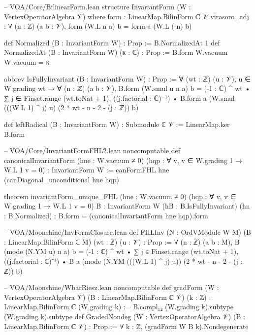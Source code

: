 \begin{leancode}
-- VOA/Core/BilinearForm.lean
structure InvariantForm (W : VertexOperatorAlgebra 𝒱) where
  form : LinearMap.BilinForm ℂ 𝒱
  virasoro_adj : ∀ (n : ℤ) (a b : 𝒱), form (W.L n a) b = form a (W.L (-n) b)

def Normalized (B : InvariantForm W) : Prop := B.NormalizedAt 1
def NormalizedAt (B : InvariantForm W) (κ : ℂ) : Prop :=
  B.form W.vacuum W.vacuum = κ

abbrev IsFullyInvariant (B : InvariantForm W) : Prop :=
  ∀ (wt : ℤ) (u : 𝒱), u ∈ W.grading wt → ∀ (n : ℤ) (a b : 𝒱),
    B.form (W.smul u n a) b
      = (-1 : ℂ) ^ wt • ∑ j ∈ Finset.range (wt.toNat + 1), ((j.factorial : ℂ)⁻¹) •
          B.form a (W.smul (((W.L 1) ^ j) u) (2 * wt - n - 2 - (j : ℤ)) b)

def leftRadical (B : InvariantForm W) : Submodule ℂ 𝒱 := LinearMap.ker B.form

-- VOA/Core/InvariantFormFHL2.lean
noncomputable def canonicalInvariantForm (hne : W.vacuum ≠ 0)
    (hqp : ∀ v, v ∈ W.grading 1 → W.L 1 v = 0) : InvariantForm W :=
  canFormFHL hne (canDiagonal_unconditional hne hqp)

theorem invariantForm_unique_FHL (hne : W.vacuum ≠ 0)
    (hqp : ∀ v, v ∈ W.grading 1 → W.L 1 v = 0) {B : InvariantForm W}
    (hB : B.IsFullyInvariant) (hn : B.Normalized) :
    B.form = (canonicalInvariantForm hne hqp).form

-- VOA/Moonshine/InvFormClosure.lean
def FHLInv (N : OrdVModule W M) (B : LinearMap.BilinForm ℂ M) (wt : ℤ) (u : 𝒱) : Prop :=
  ∀ (n : ℤ) (a b : M), B (mode (N.YM u) n a) b
    = (-1 : ℂ) ^ wt • ∑ j ∈ Finset.range (wt.toNat + 1), ((j.factorial : ℂ)⁻¹) •
        B a (mode (N.YM (((W.L 1) ^ j) u)) (2 * wt - n - 2 - (j : ℤ)) b)

-- VOA/Moonshine/WbarRiesz.lean
noncomputable def gradForm (W : VertexOperatorAlgebra 𝒱) (B : LinearMap.BilinForm ℂ 𝒱) (k : ℤ) :
    LinearMap.BilinForm ℂ (W.grading k) :=
  B.compl₁₂ (W.grading k).subtype (W.grading k).subtype
def GradedNondeg (W : VertexOperatorAlgebra 𝒱) (B : LinearMap.BilinForm ℂ 𝒱) : Prop :=
  ∀ k : ℤ, (gradForm W B k).Nondegenerate
\end{leancode}

